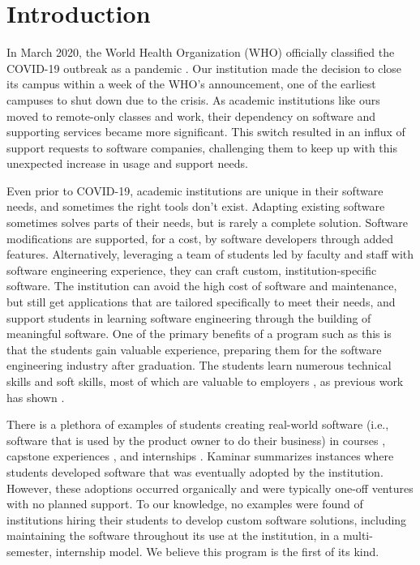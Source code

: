\section{Introduction}

In March 2020, the World Health Organization (WHO) officially classified the COVID-19 outbreak as a pandemic \cite{covid}. Our institution made the decision to close its campus within a week of the WHO's announcement, one of the earliest campuses to shut down due to the crisis. As academic institutions like ours moved to remote-only classes and work, their dependency on software and supporting services became more significant. This switch resulted in an influx of support requests to software companies, challenging them to keep up with this unexpected increase in usage and support needs.

Even prior to COVID-19, academic institutions are unique in their software needs, and sometimes the right tools don't exist. Adapting existing software sometimes solves parts of their needs, but is rarely a complete solution. Software modifications are supported, for a cost, by software developers through added features. Alternatively, leveraging a team of students led by faculty and staff with software engineering experience, they can craft custom, institution-specific software. The institution can avoid the high cost of software and maintenance, but still get applications that are tailored specifically to meet their needs, and support students in learning software engineering through the building of meaningful software. One of the primary benefits of a program such as this is that the students gain valuable experience, preparing them for the software engineering industry after graduation. The students learn numerous technical skills and soft skills, most of which are valuable to employers \cite{lavy2013soft}, as previous work has shown \cite{heggen2018hiring}.

There is a plethora of examples of students creating real-world software (i.e., software that is used by the product owner to do their business) in courses \cite{tadayon2004software}, capstone experiences \cite{capstone}, and internships \cite{rochesterfirstundergradsoftwareteam}. Kaminar \cite{kaminer_2014} summarizes instances where students developed software that was eventually adopted by the institution. However, these adoptions occurred organically and were typically one-off ventures with no planned support. To our knowledge, no examples were found of institutions hiring their students to develop custom software solutions, including maintaining the software throughout its use at the institution, in a multi-semester, internship model. We believe this program is the first of its kind.

